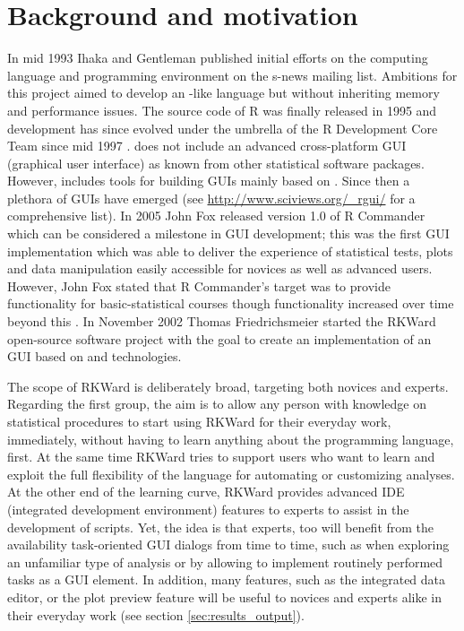 \section{Background and motivation}
\label{background}
In mid 1993 Ihaka and Gentleman published initial efforts on the computing
language and programming environment  on the s-news mailing list. Ambitions for
this project aimed to develop an -like language but without inheriting memory
and performance issues. The source code of R was finally released in 1995 and
development has since evolved under the umbrella of the R Development Core Team
since mid 1997 \citep{RDCT2001, RDCT2010, Ihaka_Gentlemen_1993}.
 does not include an advanced cross-platform GUI (graphical user interface) as known from other
statistical software packages. However,  includes tools for building GUIs
mainly based on  \citep{Dalgaard2001, Dalgaard2002}. Since then a
plethora of  GUIs have emerged (see \url{http://www.sciviews.org/_rgui/} for a
comprehensive list). In 2005 John Fox released version 1.0 of R Commander which
can be considered a milestone in  GUI development; this was the first GUI
implementation which was able to deliver the experience of statistical tests,
plots and data manipulation easily accessible for  novices as well as advanced
users. However, John Fox stated that R Commander's target was to provide
functionality for basic-statistical courses though functionality increased over
time beyond this \citep{Fox2005, Fox2007}. In November 2002 Thomas Friedrichsmeier
started the RKWard open-source software project with the goal to create an
implementation of an  GUI based on  and  technologies.

The scope of RKWard is deliberately broad, targeting both  novices and experts.
Regarding the first group, the aim is to allow any person with knowledge on
statistical procedures to start using RKWard for their everyday work,
immediately, without having to learn anything about the  programming language,
first. At the same time RKWard tries to support users who want to learn and
exploit the full flexibility of the  language for automating or customizing
analyses. At the other end of the learning curve, RKWard provides advanced IDE (integrated development environment)
features to  experts to assist in the development of  scripts. Yet, the idea
is that  experts, too will benefit from the availability task-oriented GUI
dialogs from time to time, such as when exploring an unfamiliar type of analysis
or by allowing to implement routinely performed tasks as a GUI element. In
addition, many features, such as the integrated data editor, or the plot preview
feature will be useful to  novices and  experts alike in their everyday work
(see section \ref{sec:results_output}).

